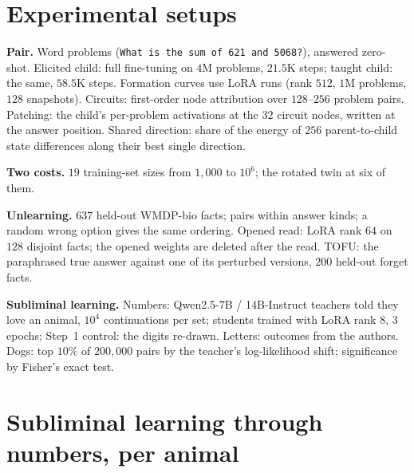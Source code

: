 \documentclass{article}
\theoremstyle{definition}
\begin{document}



\newpage
\appendix
\onecolumn

\section{Experimental setups}

\textbf{Pair.} Word problems (\texttt{What is the sum of 621 and 5068?}), answered zero-shot. Elicited child: full
fine-tuning on $4$M problems, $21.5$K steps; taught child: the same, $58.5$K steps. Formation curves use LoRA runs
(rank $512$, $1$M problems, $128$ snapshots). Circuits: first-order node attribution over $128$--$256$ problem
pairs. Patching: the child's per-problem activations at the $32$ circuit nodes, written at the answer position.
Shared direction: share of the energy of $256$ parent-to-child state differences along their best single
direction.

\textbf{Two costs.} $19$ training-set sizes from $1{,}000$ to $10^6$; the rotated twin at six of them.

\textbf{Unlearning.} $637$ held-out WMDP-bio facts; pairs within answer kinds; a random wrong option gives the same
ordering. Opened read: LoRA rank $64$ on $128$ disjoint facts; the opened weights are deleted after the read.
TOFU: the paraphrased true answer against one of its perturbed versions, $200$ held-out forget facts.

\textbf{Subliminal learning.} Numbers: Qwen2.5-7B / 14B-Instruct teachers told they love an animal, $10^4$
continuations per set; students trained with LoRA rank $8$, $3$ epochs; Step~1 control: the digits re-drawn.
Letters: outcomes from the authors. Dogs: top $10\%$ of $200{,}000$ pairs by the teacher's
log-likelihood shift; significance by Fisher's exact test.

\section{Subliminal learning through numbers, per animal}
\end{document}
